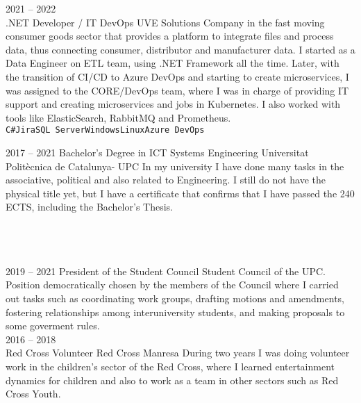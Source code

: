 \documentclass[9pt]{developercv} %
\begin{document}
\begin{entrylist}
{	}
	\entry
	{2021 -- 2022\\}
	{.NET Developer / IT DevOps}
	{UVE Solutions}
	{Company in the fast moving consumer goods sector that provides a platform to integrate files and process data, thus connecting consumer, distributor and manufacturer data.
		I started as a Data Engineer on ETL team, using .NET Framework all the time. Later, with the transition of CI/CD to Azure DevOps and starting to create microservices, I was assigned to the CORE/DevOps team, where I was in charge of providing IT support and creating microservices and jobs in Kubernetes. I also worked with tools like ElasticSearch, RabbitMQ and Prometheus.
		\\ \texttt{C\#}\slashsep\texttt{Jira}\slashsep\texttt{SQL Server}\slashsep\texttt{Windows}\slashsep\texttt{Linux}\slashsep\texttt{Azure DevOps}
	}

\end{entrylist}
\clearpage


\begin{entrylist}
	\entry
	{2017 -- 2021}
	{Bachelor's Degree in ICT Systems Engineering}
	{Universitat Politècnica de Catalunya- UPC}
	{In my university I have done many tasks in the associative, political and also related to Engineering. I still do not have the physical title yet, but I have a certificate that confirms that I have passed the 240 ECTS, including the Bachelor's Thesis.\\
		\\ \\ \\}
\end{entrylist}




\begin{entrylist}
	\entry
	{2019 -- 2021}
	{President of the Student Council}
	{Student Council of the UPC.}
	{Position democratically chosen by the members of the Council where I carried out tasks such as coordinating work groups, drafting motions and amendments, fostering relationships among interuniversity students, and making proposals to some goverment rules.\\
	}
	\entry
	{2016 -- 2018\\}
	{Red Cross Volunteer}
	{Red Cross Manresa}
	{During two years I was doing volunteer work in the children's sector of the Red Cross, where I learned entertainment dynamics for children and also to work as a team in other sectors such as Red Cross Youth.\\
	}
\end{entrylist}
\end{document}
